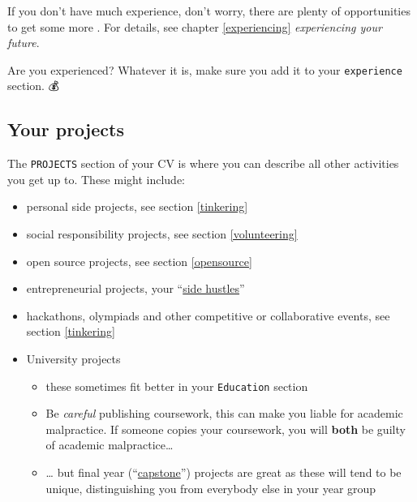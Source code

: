 \documentclass[
]{book}
\providecommand{\tightlist}{%
  \setlength{\itemsep}{0pt}\setlength{\parskip}{0pt}}
\begin{document}
If you don't have much experience, don't worry, there are plenty of opportunities to get some more . For details, see chapter \ref{experiencing} \emph{experiencing your future}.

Are you experienced? Whatever it is, make sure you add it to your \texttt{experience} section. 💰

\hypertarget{mycvpj}{%
\subsection{Your projects}\label{mycvpj}}

The \texttt{PROJECTS} section of your CV is where you can describe all other activities you get up to. These might include:

\begin{itemize}
\tightlist
\item
  personal side projects, see section \ref{tinkering}
\item
  social responsibility projects, see section \ref{volunteering}
\item
  open source projects, see section \ref{opensource}
\item
  entrepreneurial projects, your ``\href{https://en.wikipedia.org/wiki/Side_job}{side hustles}''
\item
  hackathons, olympiads and other competitive or collaborative events, see section \ref{tinkering}
\item
  University projects

  \begin{itemize}
  \tightlist
  \item
    these sometimes fit better in your \texttt{Education} section
  \item
    Be \emph{careful} publishing coursework, this can make you liable for academic malpractice. If someone copies your coursework, you will \textbf{both} be guilty of academic malpractice\ldots{}
  \item
    \ldots{} but final year (``\href{https://en.wikipedia.org/wiki/Capstone_course}{capstone}'') projects are great as these will tend to be unique, distinguishing you from everybody else in your year group
  \end{itemize}
\end{itemize}
\end{document}
